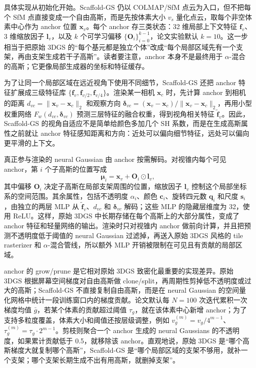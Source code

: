具体实现从初始化开始。Scaffold-GS 仍以 COLMAP/SfM 点云为入口，但不把每个 SfM 点直接变成一个自由高斯，而是先按体素大小 $v_s$ 量化点云，取每个非空体素中心作为 anchor 位置 $\mathbf{x}_v$。每个 anchor 存三类状态：32 维局部上下文特征 $\mathbf{f}_v$、3 维缩放因子 $\mathbf{l}_v$，以及 $k$ 个可学习偏移 $\{\mathbf{O}_i\}_{i=0}^{k-1}$，论文实验默认 $k=10$。这一步相当于把原始 3DGS 的“每个基元都是独立个体”改成“每个局部区域先有一个支架，再由支架生成若干子高斯”。读者要注意，anchor 本身不是最终用于 $\alpha$-混合的高斯；它更像局部生成器的坐标和特征缓存。

为了让同一个局部区域在远近视角下使用不同细节，Scaffold-GS 还把 anchor 特征扩展成三级特征库 $\{\mathbf{f}_v,\mathbf{f}_{v/2},\mathbf{f}_{v/4}\}$。渲染某一相机 $\mathbf{x}_c$ 时，先计算 anchor 到相机的距离 $d_{vc}=\|\mathbf{x}_v-\mathbf{x}_c\|_2$ 和观察方向 $\boldsymbol{\delta}_{vc}=(\mathbf{x}_v-\mathbf{x}_c)/\|\mathbf{x}_v-\mathbf{x}_c\|_2$，再用小型权重网络 $F_w(d_{vc},\boldsymbol{\delta}_{vc})$ 预测三层特征的融合权重，得到视角相关特征 $\tilde{\mathbf{f}}_v$。因此，Scaffold-GS 的视角自适应不是简单给颜色多加几个 SH 系数，而是在生成高斯属性之前就让 anchor 特征感知距离和方向：近处可以偏向细节特征，远处可以偏向更平滑的上下文。

真正参与渲染的 neural Gaussian 由 anchor 按需解码。对视锥内每个可见 anchor，第 $i$ 个子高斯的位置写成
\[
\boldsymbol{\mu}_i=\mathbf{x}_v+\mathbf{O}_i\odot\mathbf{l}_v ,
\]
其中偏移 $\mathbf{O}_i$ 决定子高斯在局部支架周围的位置，缩放因子 $\mathbf{l}_v$ 控制这个局部坐标系的空间范围。其余属性，包括不透明度 $\alpha_i$、颜色 $\mathbf{c}_i$、旋转四元数 $\mathbf{q}_i$ 和尺度 $\mathbf{s}_i$，由独立的两层 MLP 从 $\tilde{\mathbf{f}}_v$、$d_{vc}$ 和 $\boldsymbol{\delta}_{vc}$ 解码；这些 MLP 的隐藏层维度为 32，使用 ReLU。这样，原始 3DGS 中长期存储在每个高斯上的大部分属性，变成了 anchor 特征和轻量网络的输出。渲染时只对视锥内 anchor 做前向计算，并且把预测不透明度低于阈值的 neural Gaussian 过滤掉，再送入原始 3DGS 风格的 tile rasterizer 和 $\alpha$-混合管线，所以额外 MLP 开销被限制在可见且有贡献的局部区域。

anchor 的 grow/prune 是它相对原始 3DGS 致密化最重要的实现差异。原始 3DGS 根据屏幕空间梯度对自由高斯做 clone/split，再周期性剪掉低不透明度或过大的高斯；Scaffold-GS 不直接复制自由高斯，而是在 neural Gaussian 的空间量化网格中统计一段训练窗口内的梯度贡献。论文默认每 $N=100$ 次迭代累积一次梯度均值 $\bar{g}$，若某个体素的贡献超过阈值 $\tau_g$，就在该体素中心新增 anchor；为了支持多粒度覆盖，体素大小和阈值还按层级调整，例如 $v_g^{(m)}=v_g/4^{m-1}$、$\tau_g^{(m)}=\tau_g\cdot 2^{m-1}$。剪枝则聚合一个 anchor 生成的 neural Gaussians 的不透明度，如果累计贡献低于 0.5，就移除该 anchor。直观地说，原始 3DGS 是“哪个高斯梯度大就复制哪个高斯”，Scaffold-GS 是“哪个局部区域的支架不够用，就补一个支架；哪个支架长期生成不出有用高斯，就删掉支架”。

